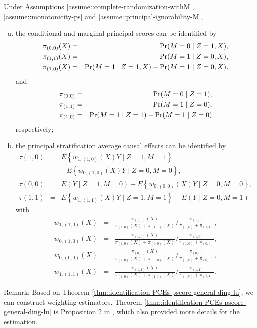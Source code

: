 \begin{HomeworkProblem}
\begin{Theorem}
\label{thm::identification-PCEs-pscore-general-ding-lu}
Under Assumptions \ref{assume::complete-randomization-withM}, \ref{assume::monotonicity-ps} and \ref{assume::principal-ignorability-M},
\begin{enumerate}
[(a)]
\item
 the conditional and marginal principal scores can be identified by
\begin{eqnarray*}
\pi_{(0,0)}(X) &=& \operatorname{Pr}(M=0\mid Z=1, X),\\
\pi_{(1,1)}(X) &=& \operatorname{Pr}(M=1\mid Z=0, X),\\
\pi_{(1,0)}(X) &=& \operatorname{Pr}(M=1\mid Z=1, X) - \operatorname{Pr}(M=1\mid Z=0, X).
\end{eqnarray*}
and
\begin{eqnarray*}
\pi_{(0,0)} &=& \operatorname{Pr}(M=0\mid Z=1),\\
\pi_{(1,1)} &=& \operatorname{Pr}(M=1\mid Z=0),\\
\pi_{(1,0)} &=& \operatorname{Pr}(M=1\mid Z=1) - \operatorname{Pr}(M=1\mid Z=0)
\end{eqnarray*}
respectively;
\item
the principal  stratification average causal effects can be identified by
\begin{eqnarray*}
\tau(1,0) &=& E\left\{w_{1, (1,0)}(X) Y \mid Z=1, M=1\right\}  \\
&& -E\left\{w_{0, (1,0)}(X) Y \mid Z=0, M=0\right\} , \\
\tau(0,0) &=& E(Y \mid Z=1, M=0)-E\left\{w_{0, (0,0)}( X ) Y \mid Z=0, M=0\right\}, \\
\tau(1,1) &=& E\left\{w_{1,  (1,1)}( X ) Y \mid Z=1, M=1\right\}-E(Y \mid Z=0, M=1)
\end{eqnarray*}
with
\begin{eqnarray*}
w_{1, (1,0)}(X) &=&\frac{\pi_{(1,0)}(X)}{\pi_{(1,0)}(X)+\pi_{(1,1)}(X)} \Big / \frac{\pi_{(1,0)}}{\pi_{(1,0)}+\pi_{(1,1)}} , \\
w_{0, (1,0)}(X) &=& \frac{\pi_{(1,0)}(X)}{\pi_{(1,0)}(X)+\pi_{(0,0)}(X)} \Big / \frac{\pi_{(1,0)}}{\pi_{(1,0)}+\pi_{(0,0)}} ,  \\
w_{0, (0,0)}(X) &=&\frac{\pi_{(0,0)}(X)}{\pi_{(1,0)}(X)+\pi_{(0,0)}(X)} \Big / \frac{\pi_{(0,0)}}{\pi_{(1,0)}+\pi_{(0,0)}} , \\
w_{1, (1,1)}(X) &=&\frac{\pi_{(1,1)}(X)}{\pi_{(1,0)}(X)+\pi_{(1,1)}(X)} \Big / \frac{\pi_{(1,1)}}{\pi_{(1,0)}+\pi_{(1,1)}} .
\end{eqnarray*}
\end{enumerate}
\end{Theorem}



Remark:
Based on Theorem \ref{thm::identification-PCEs-pscore-general-ding-lu}, we can construct weighting estimators. Theorem \ref{thm::identification-PCEs-pscore-general-ding-lu} is Proposition 2 in \citet{ding2017principal}, which also provided more details for the estimation.



\end{HomeworkProblem}


